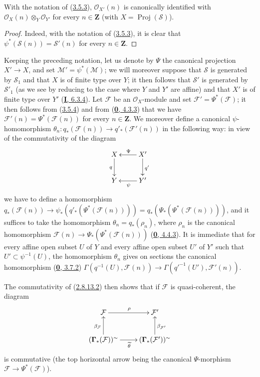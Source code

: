\begin{corollary}[3.5.4]
\label{II.3.5.4}
With the notation of \textup{(\hyperref[II.3.5.3]{3.5.3})},
$\mathcal{O}_{X'}(n)$ is canonically identified with
$\mathcal{O}_X(n)\otimes_Y\mathcal{O}_{Y'}$ for every $n\in\mathbf{Z}$ (with
$X=\operatorname{Proj}(\mathcal{S})$).
\end{corollary}

\begin{proof}
Indeed, with the notation of (\hyperref[II.3.5.3]{3.5.3}), it is clear
that $\psi^*(\mathcal{S}(n))=\mathcal{S}'(n)$ for every $n\in\mathbf{Z}$.
\end{proof}

\begin{env}[3.5.5]
\label{II.3.5.5}
Keeping the preceding notation, let us denote by $\Psi$ the canonical
projection $X'\to X$, and set $\mathcal{M}'=\psi^*(\mathcal{M})$; we
will moreover suppose that $\mathcal{S}$ is generated by $\mathcal{S}_1$
and that $X$ is of finite type over $Y$; it then follows that $\mathcal{S}'$
is generated by $\mathcal{S}'_1$ (as we see by reducing to the case where
$Y$ and $Y'$ are affine) and that $X'$ is of finite type over $Y'$
(\hyperref[I.6.3.4]{\textbf{I}, 6.3.4}). Let $\mathcal{F}$ be an
$\mathcal{O}_X$-module and set $\mathcal{F}'=\Psi^*(\mathcal{F})$; it
then follows from (\hyperref[II.3.5.4]{3.5.4}) and from
(\hyperref[0.4.3.3]{\textbf{0}, 4.3.3}) that we have
$\mathcal{F}'(n)=\Psi^*(\mathcal{F}(n))$ for every $n\in\mathbf{Z}$. We
moreover define a canonical $\psi$-homomorphism
$\theta_n:q_*(\mathcal{F}(n))\to q'_*(\mathcal{F}'(n))$ in the following
way: in view of the commutativity of the diagram
\[
  \xymatrix{
    X\ar[d]_{q}
    & X'\ar[l]_{\Psi}\ar[d]^{q'}\\
    Y
    & Y'\ar[l]^{\psi}
  }
\]
we have to define a homomorphism
$q_*(\mathcal{F}(n))\to
\psi_*(q'_*(\Psi^*(\mathcal{F}(n))))
=q_*(\Psi_*(\Psi^*(\mathcal{F}(n))))$, and it suffices to take
the homomorphism $\theta_n=q_*(\rho_n)$, where $\rho_n$ is the canonical
homomorphism
$\mathcal{F}(n)\to\Psi_*(\Psi^*(\mathcal{F}(n)))$
(\hyperref[0.4.4.3]{\textbf{0}, 4.4.3}). It is immediate that for every affine open
subset $U$ of $Y$ and every affine open subset $U'$ of $Y'$ such that
$U'\subset\psi^{-1}(U)$, the homomorphism $\theta_n$ gives on sections
the canonical homomorphism (\hyperref[0.3.7.2]{\textbf{0}, 3.7.2})
$\Gamma(q^{-1}(U),\mathcal{F}(n))\to
\Gamma(q'^{-1}(U'),\mathcal{F}'(n))$.

The commutativity of (\hyperref[II.2.8.13.2]{2.8.13.2}) then shows that if
$\mathcal{F}$ is quasi-coherent, the diagram
\[
  \xymatrix{
    \mathcal{F}\ar[r]^{\rho}
    & \mathcal{F}'\\
    (\mathbf{\Gamma}_*(\mathcal{F}))^{\sim}
      \ar[u]^{\beta_{\mathcal{F}}}\ar[r]_{\widetilde{\theta}}
    & (\mathbf{\Gamma}_*(\mathcal{F}'))^{\sim}
      \ar[u]_{\beta_{\mathcal{F}'}}
  }
\]
is commutative (the top horizontal arrow being the canonical
$\Psi$-morphism $\mathcal{F}\to\Psi^*(\mathcal{F})$).


\end{env}
